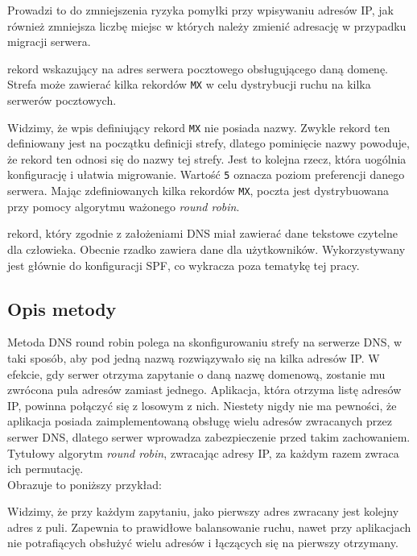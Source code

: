 {\begin{description}
Prowadzi to do zmniejszenia ryzyka pomyłki przy wpisywaniu adresów IP, jak również zmniejsza liczbę miejsc w których należy zmienić adresację w przypadku migracji serwera.
\item[MX] rekord wskazujący na adres serwera pocztowego obsługującego daną domenę.
Strefa może zawierać kilka rekordów \texttt{MX} w celu dystrybucji ruchu na kilka serwerów pocztowych.

Widzimy, że wpis definiujący rekord \texttt{MX} nie posiada nazwy. Zwykle rekord ten definiowany jest na początku definicji strefy, dlatego pominięcie nazwy powoduje, że rekord ten odnosi się do nazwy tej strefy.
Jest to kolejna rzecz, która uogólnia konfigurację i ułatwia migrowanie.
Wartość \texttt{5} oznacza poziom preferencji danego serwera. Mając zdefiniowanych kilka rekordów \texttt{MX}, poczta jest dystrybuowana przy pomocy algorytmu ważonego \textit{round robin}.
\item[TXT] rekord, który zgodnie z założeniami DNS miał zawierać dane tekstowe czytelne dla człowieka.
Obecnie rzadko zawiera dane dla użytkowników. Wykorzystywany jest głównie do konfiguracji SPF, co wykracza poza tematykę tej pracy.
\end{description}
\subsection{Opis metody}
Metoda DNS round robin polega na skonfigurowaniu strefy na serwerze DNS, w taki sposób, aby pod jedną nazwą rozwiązywało się na kilka adresów IP.
W efekcie, gdy serwer otrzyma zapytanie o daną nazwę domenową, zostanie mu zwrócona pula adresów zamiast jednego.
Aplikacja, która otrzyma listę adresów IP, powinna połączyć się z losowym z nich.
Niestety nigdy nie ma pewności, że aplikacja posiada zaimplementowaną obsługę wielu adresów zwracanych przez serwer DNS, dlatego serwer wprowadza zabezpieczenie przed takim zachowaniem. Tytułowy algorytm \textit{round robin}, zwracając adresy IP, za każdym razem zwraca ich permutację.\\
Obrazuje to poniższy przykład:

Widzimy, że przy każdym zapytaniu, jako pierwszy adres zwracany jest kolejny adres z puli. Zapewnia to prawidłowe balansowanie ruchu, nawet przy aplikacjach nie potrafiących obsłużyć wielu adresów i łączących się na pierwszy otrzymany.

}
